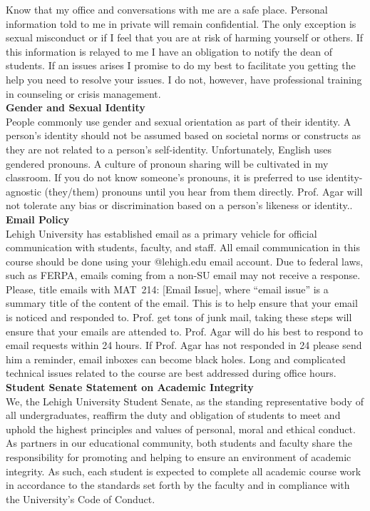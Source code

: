 \documentclass[11pt,letterpaper]{article}
\newcommand{\lefthead}[2]{\noindent\textbf{#1}\hfill\\[#2]}
\begin{document}
Know that my office and conversations with me are a safe place. 
Personal information told to me in private will remain confidential. 
The only exception is sexual misconduct or if I feel that you are at risk of harming yourself or others. 
If this information is relayed to me I have an obligation to notify the dean of students.
If an issues arises I promise to do my best to facilitate you getting the help you need to resolve your issues. 
I do not, however, have professional training in counseling or crisis management.\\[.3cm]  

\lefthead{Gender and Sexual Identity}{0.3cm}

\noindent People commonly use gender and sexual orientation as part of their identity. A person's identity should not be assumed based on societal norms or constructs as they are not related to a person's self-identity. Unfortunately, English uses gendered pronouns. A culture of pronoun sharing will be cultivated in my classroom. If you do not know someone's pronouns, it is preferred to use identity-agnostic (they/them) pronouns until you hear from them directly. Prof. Agar will not tolerate any bias or discrimination based on a person's likeness or identity..\\[0.3cm]

\lefthead{Email Policy}{0.3cm}
\noindent Lehigh University has established email as a primary vehicle for official communication with students, faculty, and staff. All email communication in this course should be done using your @lehigh.edu email account. Due to federal laws, such as FERPA, emails coming from a non-SU email may not receive a response. Please, title emails with MAT~214: [Email Issue], where ``email issue'' is a summary title of the content of the email. This is to help ensure that your email is noticed and responded to. 
Prof. get tons of junk mail, taking these steps will ensure that your emails are attended to.
Prof. Agar will do his best to respond to email requests within 24 hours.
If Prof. Agar has not responded in 24 please send him a reminder, email inboxes can become black holes.
Long and complicated technical issues related to the course are best addressed during office hours.\\[0.3cm]

\lefthead{Student Senate Statement on Academic Integrity}{0.3cm}
We, the Lehigh University Student Senate, as the standing representative body of all undergraduates, reaffirm the duty and obligation of students to meet and uphold the highest principles and values of personal, moral and ethical conduct.
As partners in our educational community, both students and faculty share the responsibility for promoting and helping to ensure an environment of academic integrity.
As such, each student is expected to complete all academic course work in accordance to the standards set forth by the faculty and in compliance with the University's Code of Conduct.
\end{document}
